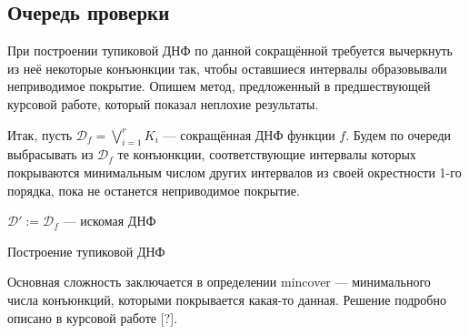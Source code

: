 \documentclass[12pt,a4paper,oneside,fleqn,leqno]{article}
\theoremstyle{definition}
\begin{document}
		\subsection{Очередь проверки}
			При построении тупиковой ДНФ по данной сокращённой требуется вычеркнуть из неё некоторые конъюнкции так, чтобы оставшиеся интервалы образовывали неприводимое покрытие. Опишем метод, предложенный в предшествующей курсовой работе, который показал неплохие результаты.\par
			Итак, пусть $\mathcal{D}_f = \bigvee\limits_{i = 1}^r K_i$ --- сокращённая ДНФ функции $f$. Будем по очереди выбрасывать из $\mathcal{D}_f$ те конъюнкции, соответствующие интервалы которых покрываются минимальным числом других интервалов из своей окрестности 1-го порядка, пока не останется неприводимое покрытие.\par
			\begin{algorithm}[H]
				\SetAlgoLined
				$\mathcal{D}' \mathbin{:=} \mathcal{D}_f$ --- искомая ДНФ\;	
			\caption{Построение тупиковой ДНФ}
			\label{get_irred}
		\end{algorithm}\par
		Основная сложность заключается в определении mincover --- минимального числа конъюнкций, которыми покрывается какая-то данная. Решение подробно описано в курсовой работе [?].
\end{document}
